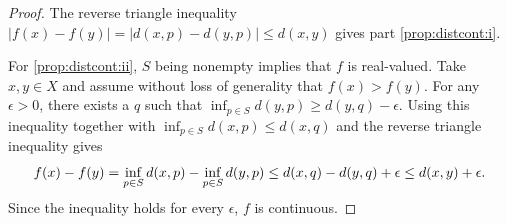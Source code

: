 \documentclass[12pt,openany]{book}
\newcommand{\avoidbreak}{\postdisplaypenalty=100}
\newcommand{\sabs}[1]{\lvert {#1} \rvert}
\theoremstyle{plain}
\theoremstyle{remark}
\theoremstyle{definition}
\theoremstyle{exercise}
\theoremstyle{example}
\begin{document}
\begin{proof}
The reverse triangle inequality
$\sabs{f(x)-f(y)} = \sabs{d(x,p)-d(y,p)} \leq d(x,y)$
gives part \ref{prop:distcont:i}.

For \ref{prop:distcont:ii}, $S$ being nonempty implies that $f$ is
real-valued.  Take $x,y \in X$ and assume without loss of generality
that $f(x) > f(y)$.
For any $\epsilon > 0$, there exists a $q$ such that
$\inf_{p \in S} d(y,p) \geq d(y,q) - \epsilon$.
Using this inequality together with
$\inf_{p \in S} d(x,p) \leq d(x,q)$ and
the reverse triangle inequality gives
\begin{equation*}
f(x)-f(y) =
\inf_{p \in S} d(x,p)
-
\inf_{p \in S} d(y,p)
\leq
d(x,q) - d(y,q) + \epsilon 
\leq d(x,y) + \epsilon.
\avoidbreak
\end{equation*}
Since the inequality holds for every $\epsilon$, $f$ is continuous.
\end{proof}
\end{document}
